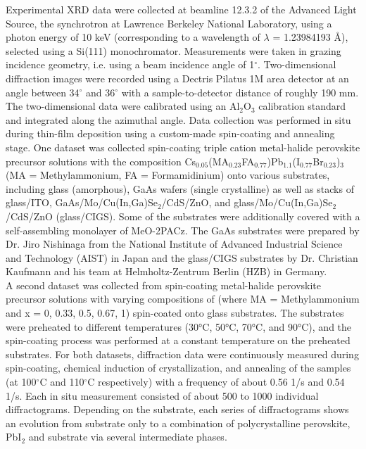 Experimental XRD data were collected at beamline 12.3.2 of the Advanced Light Source, the synchrotron at Lawrence Berkeley National Laboratory, using a photon energy of 10 keV (corresponding to a wavelength of $\lambda$ = 1.23984193 Å), selected using a Si(111) monochromator. Measurements were taken in grazing incidence geometry, i.e. using a beam incidence angle of 1$^{\circ}$. Two-dimensional diffraction images were recorded using a Dectris Pilatus 1M area detector at an angle between 34$^{\circ}$ and 36$^{\circ}$ with a sample-to-detector distance of roughly 190 mm. The two-dimensional data were calibrated using an Al$_{2}$O$_{3}$ calibration standard and integrated along the azimuthal angle. Data collection was performed in situ during thin-film deposition using a custom-made spin-coating and annealing stage. One dataset was collected spin-coating triple cation metal-halide perovskite precursor solutions with the composition Cs$_{0.05}$(MA$_{0.23}$FA$_{0.77}$)Pb$_{1.1}$(I$_{0.77}$Br$_{0.23}$)$_{3}$ (MA = Methylammonium, FA = Formamidinium) onto various substrates, including glass (amorphous), GaAs wafers (single crystalline) as well as stacks of glass/ITO, GaAs/Mo/Cu(In,Ga)Se$_{2}$/CdS/ZnO, and glass/Mo/Cu(In,Ga)Se$_{2}$/CdS/ZnO (glass/CIGS). Some of the substrates were additionally covered with a self-assembling monolayer of MeO-2PACz. The GaAs substrates were prepared by Dr. Jiro Nishinaga from the National Institute of Advanced Industrial Science and Technology (AIST) in Japan and the glass/CIGS substrates by Dr. Christian Kaufmann and his team at Helmholtz-Zentrum Berlin (HZB) in Germany. \\

A second dataset was collected from spin-coating metal-halide perovskite precursor solutions with varying compositions of  (where MA = Methylammonium and x = 0, 0.33, 0.5, 0.67, 1) spin-coated onto glass substrates. The substrates were preheated to different temperatures (30°C, 50°C, 70°C, and 90°C), and the spin-coating process was performed at a constant temperature on the preheated substrates. For both datasets, diffraction data were continuously measured during spin-coating, chemical induction of crystallization, and annealing of the samples (at 100$^{\circ}$C and 110$^{\circ}$C respectively) with a frequency of about 0.56 1/s and  0.54 1/s. Each in situ measurement consisted of about 500 to 1000 individual diffractograms. Depending on the substrate, each series of diffractograms shows an evolution from substrate only to a combination of polycrystalline perovskite, PbI$_{2}$ and substrate via several intermediate phases.


